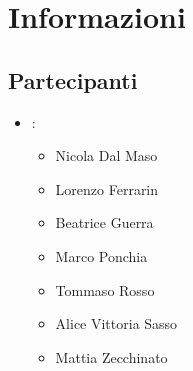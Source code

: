 \section{Informazioni}
\subsection{Partecipanti}

\begin{itemize}
	\item \GroupName:
	\begin{itemize}
		\item Nicola Dal Maso
		\item Lorenzo Ferrarin
		\item Beatrice Guerra
		\item Marco Ponchia
		\item Tommaso Rosso
		\item Alice Vittoria Sasso
		\item Mattia Zecchinato
	\end{itemize}
\end{itemize}

\clearpage
